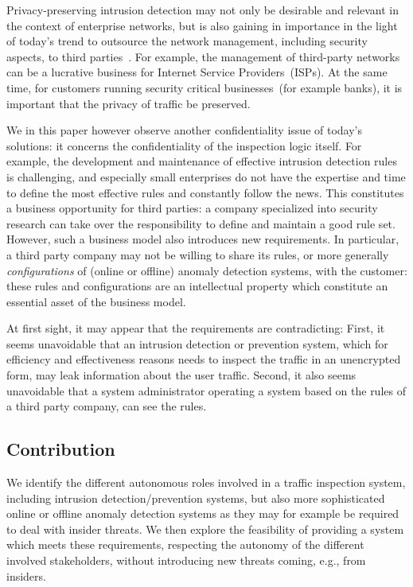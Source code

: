 \documentclass{sig-alternate-10pt}
\begin{document}
Privacy-preserving intrusion detection may not only be desirable and relevant in the
context of enterprise networks, but is also gaining in importance in the
light of today's trend to outsource the network management,
including security aspects, to third parties~\cite{someone}.
For example, the management of third-party networks can be a lucrative
business for Internet Service Providers~(ISPs). At the same time, for customers
running security critical businesses~(for example banks), it is important
that the privacy of traffic be preserved. 

We in this paper however observe another confidentiality issue of today's solutions:
it concerns the confidentiality of the inspection
logic itself.  
For example, the development and maintenance of
effective intrusion detection rules is challenging, and
especially
small enterprises do not have the expertise and time to define
the most effective rules and constantly follow the news.
This constitutes a business opportunity for third parties: a company specialized into security
research can take over the responsibility to define and maintain a
good rule set.
However, such a business model also introduces new requirements.
In particular, a third party company may not be willing to share
its rules, or more generally \emph{configurations} of (online or offline) 
anomaly detection systems,
with the customer: these rules and configurations are an intellectual property 
which constitute an essential
asset of the business model.

At first sight, it may appear that the requirements are contradicting:
First, it seems unavoidable that an intrusion detection or prevention system, 
which for efficiency and effectiveness reasons needs to inspect the traffic
in an unencrypted form, may leak information about the user traffic.
Second, it also seems unavoidable that a system administrator operating
a system based on the rules of a third party company, can see the rules.

\subsection{Contribution}

We identify the different autonomous roles involved in 
a traffic inspection system, including intrusion detection/prevention 
systems, but also more sophisticated online or offline anomaly
detection systems as they may for example be required 
to deal with insider threats.
We then explore the feasibility of providing a system
which meets these requirements, respecting the 
autonomy of the different involved stakeholders,
without introducing new threats coming, e.g., from insiders.
\end{document}
